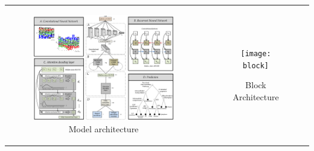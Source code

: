 \begin{tabular}{|c|c|}
\hline
\begin{figure}
\includegraphics[width=0.5textwidth]{architecture}
 \caption{Model architecture}
\end{figure}  
& 
\begin{figure}[h]
	\centering
	\texttt{[image: block]}
	\caption{Block Architecture}
	\label{fig:block}
\end{figure}
\hline
\end{tabular}
